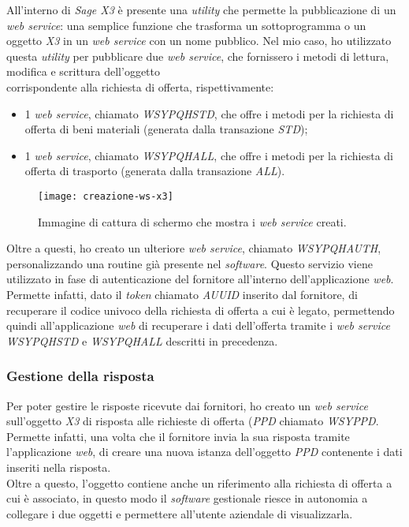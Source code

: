 All'interno di \textit{Sage X3} è presente una \textit{utility} che permette la pubblicazione di un \textit{web service}: una semplice funzione che trasforma un sottoprogramma o un oggetto \textit{X3} in un \textit{web service} con un nome pubblico.
Nel mio caso, ho utilizzato questa \textit{utility} per pubblicare due \textit{web service}, che fornissero i metodi di lettura, modifica e scrittura dell'oggetto \\
 corrispondente alla richiesta di offerta, rispettivamente:
\begin{itemize}
	\item 1 \textit{web service}, chiamato \textit{WSYPQHSTD}, che offre i metodi per la richiesta di offerta di beni materiali (generata dalla transazione \textit{STD}); 
	\item 1 \textit{web service}, chiamato \textit{WSYPQHALL}, che offre i metodi per la richiesta di offerta di trasporto (generata dalla transazione \textit{ALL}).
\end{itemize}


\begin{figure}[htbp]
	\begin{center}
		\texttt{[image: creazione-ws-x3]}
		\caption{Immagine di cattura di schermo che mostra i \textit{web service} creati.}
	\end{center}
\end{figure}

Oltre a questi, ho creato un ulteriore \textit{web service}, chiamato \textit{WSYPQHAUTH}, personalizzando una routine già presente nel \textit{software}. 
Questo servizio viene utilizzato in fase di autenticazione del fornitore all'interno dell'applicazione \textit{web}. 
Permette infatti, dato il \textit{token} chiamato \textit{AUUID} inserito dal fornitore, di recuperare il codice univoco della richiesta di offerta a cui è legato, permettendo quindi all'applicazione \textit{web} di recuperare i dati dell'offerta tramite i \textit{web service} \textit{WSYPQHSTD} e \textit{WSYPQHALL} descritti in precedenza.

\subsubsection{Gestione della risposta}
Per poter gestire le risposte ricevute dai fornitori, ho creato un \textit{web service} sull'oggetto \textit{X3} di risposta alle richieste di offerta (\textit{PPD} chiamato \textit{WSYPPD}.
Permette infatti, una volta che il fornitore invia la sua risposta tramite l'applicazione \textit{web}, di creare una nuova istanza dell'oggetto \textit{PPD} contenente i dati inseriti nella risposta.\\
Oltre a questo, l'oggetto contiene anche un riferimento alla richiesta di offerta a cui è associato, in questo modo il \textit{software} gestionale riesce in autonomia a collegare i due oggetti e permettere all'utente aziendale di visualizzarla. 
\vspace{20pt}

